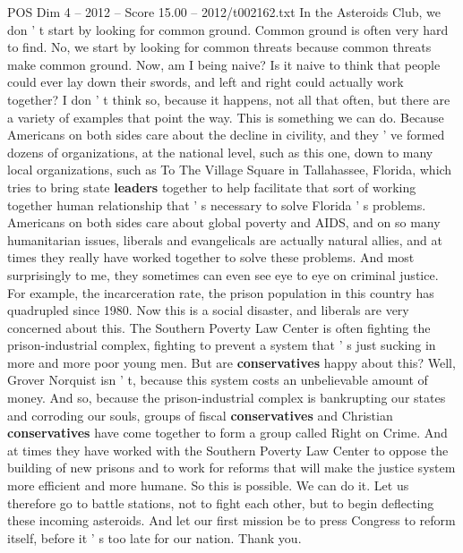 \begin{textsample}{POS Dim 4 – 2012 – Score 15.00 – 2012/t002162.txt}
In the Asteroids Club, we don ' t start by looking for common ground.
Common ground is often very hard to find.
No, we start by looking for common threats because common threats make common ground.
Now, am I being naive?
Is it naive to think that people could ever lay down their swords, and left and right could actually work together?
I don ' t think so, because it happens, not all that often, but there are a variety of examples that point the way.
This is something we can do.
Because Americans on both sides care about the decline in civility, and they ' ve formed dozens of organizations, at the national level, such as this one, down to many local organizations, such as To The Village Square in Tallahassee, Florida, which tries to bring state \textbf{leaders} together to help facilitate that sort of working together human relationship that ' s necessary to solve Florida ' s problems.
Americans on both sides care about global poverty and AIDS, and on so many humanitarian issues, liberals and evangelicals are actually natural allies, and at times they really have worked together to solve these problems.
And most surprisingly to me, they sometimes can even see eye to eye on criminal justice.
For example, the incarceration rate, the prison population in this country has quadrupled since 1980.
Now this is a social disaster, and liberals are very concerned about this.
The Southern Poverty Law Center is often fighting the prison-industrial complex, fighting to prevent a system that ' s just sucking in more and more poor young men.
But are \textbf{conservatives} happy about this?
Well, Grover Norquist isn ' t, because this system costs an unbelievable amount of money.
And so, because the prison-industrial complex is bankrupting our states and corroding our souls, groups of fiscal \textbf{conservatives} and Christian \textbf{conservatives} have come together to form a group called Right on Crime.
And at times they have worked with the Southern Poverty Law Center to oppose the building of new prisons and to work for reforms that will make the justice system more efficient and more humane.
So this is possible.
We can do it.
Let us therefore go to battle stations, not to fight each other, but to begin deflecting these incoming asteroids.
And let our first mission be to press Congress to reform itself, before it ' s too late for our nation.
Thank you.

\end{textsample}
